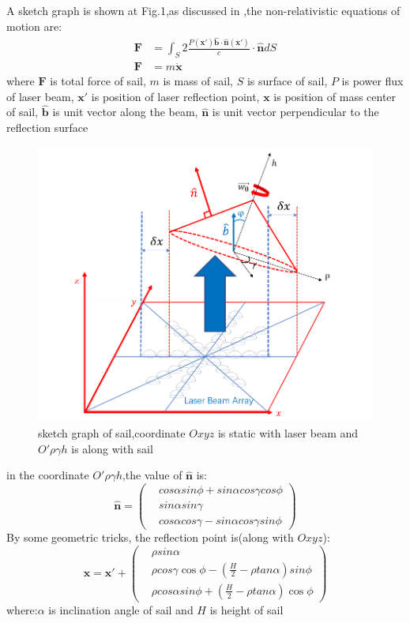 \documentclass{article}
\begin{document}
A sketch graph is shown at Fig.1,as discussed in \cite{},the non-relativistic equations of motion are:
\begin{align}
\boldsymbol{F} &= \int_S 2\frac{P( \boldsymbol{x'})\hat{\boldsymbol{b}}\cdot\hat{\boldsymbol{n}}(\boldsymbol{x'})}{c}\cdot\hat{\boldsymbol{n}}dS \\
\boldsymbol{F} &= m\boldsymbol{\ddot{x}}
\end{align}
where $\boldsymbol{F}$ is total force of sail, $m$ is mass of sail, $S$ is surface of sail, $P$ is power flux of laser beam, $\boldsymbol{x'}$ is position of laser reflection point, $\boldsymbol{x}$ is position of mass center of sail, $\hat{\boldsymbol{b}}$ is unit vector along the beam, $\hat{\boldsymbol{n}}$ is unit vector perpendicular to the reflection surface\\
\begin{figure}[htpb]
	\centering
	\includegraphics[scale=0.3]{scheme.png}
	\caption{sketch graph of sail,coordinate $Oxyz$ is static with laser beam and $O'\rho\gamma h$ is along with sail}
\end{figure}
in the coordinate $O'\rho\gamma h$,the value of $\hat{\boldsymbol{n}}$ is:
\begin{equation}
\hat{\boldsymbol{n}} = 
\begin{pmatrix}
&cos\alpha sin\phi +sin\alpha cos\gamma cos\phi\\
&sin\alpha sin\gamma\\
&cos\alpha cos\gamma - sin\alpha cos\gamma sin\phi
\end{pmatrix}
\end{equation}
By some geometric tricks, the reflection point is(along with $Oxyz$):
\begin{equation}
\boldsymbol{x} = \boldsymbol{x'} + 
\begin{pmatrix}
&\rho sin\alpha\\
&\rho cos\gamma\cos\phi -(\frac{H}{2}-\rho tan\alpha)sin\phi\\
&\rho cos\alpha sin\phi + (\frac{H}{2}-\rho tan\alpha)\cos\phi
\end{pmatrix}
\end{equation}
where:$\alpha$ is inclination angle of sail and $H$ is height of sail\\
\end{document}
